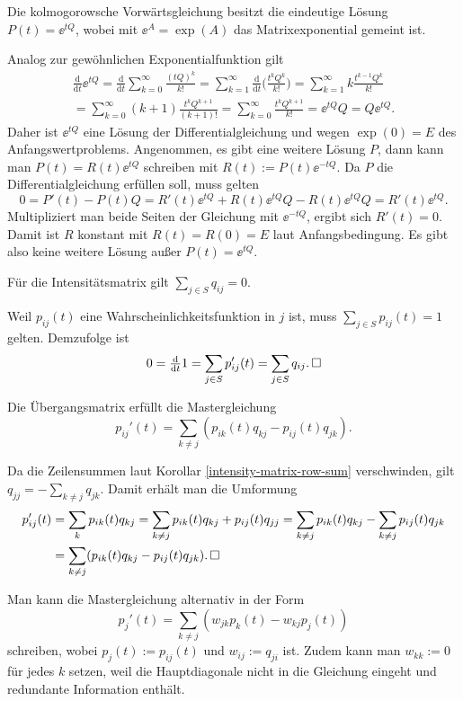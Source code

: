 \begin{Satz}
Die kolmogorowsche Vorwärtsgleichung besitzt die eindeutige Lösung
$P(t)=\ee^{tQ}$, wobei mit $\ee^A=\exp(A)$ das Matrixexponential
gemeint ist. 
\end{Satz}
\begin{Beweis}
Analog zur gewöhnlichen Exponentialfunktion gilt
\begin{gather*}
\frac{\mathrm d}{\mathrm dt}\ee^{tQ}
= \frac{\mathrm d}{\mathrm dt}\sum_{k=0}^\infty \frac{(tQ)^k}{k!}
= \sum_{k=1}^\infty \frac{\mathrm d}{\mathrm dt}\bigg(\frac{t^k Q^k}{k!}\bigg)
= \sum_{k=1}^\infty k\frac{t^{k-1} Q^k}{k!}\\
= \sum_{k=0}^\infty (k+1)\frac{t^k Q^{k+1}}{(k+1)!}
= \sum_{k=0}^\infty \frac{t^k Q^{k+1}}{k!} = \ee^{tQ}Q = Q\ee^{tQ}.
\end{gather*}
Daher ist $\ee^{tQ}$ eine Lösung der Differentialgleichung und
wegen $\exp(0)=E$ des Anfangswertproblems. Angenommen, es gibt eine
weitere Lösung $P$, dann kann man $P(t) = R(t)\ee^{tQ}$
schreiben mit $R(t):=P(t)\ee^{-tQ}$. Da $P$ die
Differentialgleichung erfüllen soll, muss gelten
\[0 = P'(t) - P(t)Q = R'(t)\ee^{tQ} + R(t)\ee^{tQ}Q - R(t)\ee^{tQ}Q = R'(t)\ee^{tQ}.\]
Multipliziert man beide Seiten der Gleichung mit $\ee^{-tQ}$, ergibt sich
$R'(t)=0$. Damit ist $R$ konstant mit $R(t)=R(0)=E$ laut Anfangsbedingung.
Es gibt also keine weitere Lösung außer $P(t)=\ee^{tQ}$.\,\qedsymbol
\end{Beweis}

\begin{Korollar}\label{intensity-matrix-row-sum}
Für die Intensitätsmatrix gilt $\sum_{j\in S} q_{ij} = 0$.
\end{Korollar}
\begin{Beweis}
Weil $p_{ij}(t)$ eine Wahrscheinlichkeitsfunktion in $j$ ist, muss
$\sum_{j\in S}p_{ij}(t)=1$ gelten. Demzufolge ist
\[0  = \tfrac{\mathrm d}{\mathrm dt} 1 = \sum_{j\in S} p_{ij}'(t)
= \sum_{j\in S} q_{ij}.\,\square\]
\end{Beweis}

\begin{Korollar}[Mastergleichung]\newlinefirst
Die Übergangsmatrix erfüllt die Mastergleichung
\[p_{ij}'(t) = \sum_{k\ne j} (p_{ik}(t)q_{kj} - p_{ij}(t)q_{jk}).\]
\end{Korollar}
\begin{Beweis}
Da die Zeilensummen laut Korollar \ref{intensity-matrix-row-sum}
verschwinden, gilt $q_{jj} = -\sum_{k\ne j} q_{jk}$.
Damit erhält man die Umformung
\begin{align*}
p_{ij}'(t) &= \sum_k p_{ik}(t)q_{kj}
= \sum_{k\ne j} p_{ik}(t)q_{kj} + p_{ij}(t)q_{jj}
= \sum_{k\ne j} p_{ik}(t)q_{kj} - \sum_{k\ne j} p_{ij}(t)q_{jk}\\
&= \sum_{k\ne j} (p_{ik}(t)q_{kj} - p_{ij}(t)q_{jk}).\,\square
\end{align*}
\end{Beweis}
 Man kann die Mastergleichung alternativ in der Form
\[p_j'(t) = \sum_{k\ne j} (w_{jk}p_k(t) - w_{kj}p_j(t))\]
schreiben, wobei $p_j(t):=p_{ij}(t)$ und $w_{ij}:=q_{ji}$ ist.
Zudem kann man $w_{kk}:=0$ für jedes $k$ setzen, weil die Hauptdiagonale
nicht in die Gleichung eingeht und redundante Information enthält.

